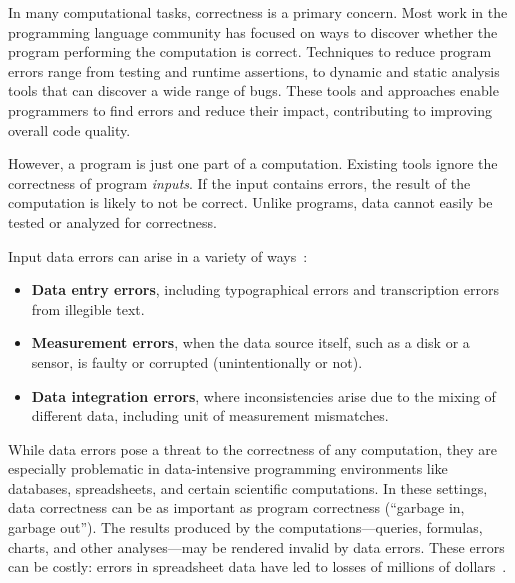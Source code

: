 In many computational tasks, correctness is a primary concern. Most
work in the programming language community has
focused on ways to discover whether the program performing the
computation is correct. Techniques to reduce program errors range from
testing and runtime assertions, to dynamic and static analysis tools
that can discover a wide range of bugs. These tools and approaches enable programmers to find errors and
reduce their impact, contributing to improving overall code quality.


However, a program is just one part of a computation. Existing tools ignore the correctness of program \emph{inputs}. If the input contains errors, the
result of the computation is likely to not be correct. Unlike
programs, data cannot easily be tested or analyzed for correctness.

Input data
errors can arise in a variety of ways~\cite{hellerstein2008quantitative}:

\begin{itemize}

\item {\bf Data entry errors}, including typographical errors and transcription errors from illegible text.

\item {\bf Measurement errors}, when the data source itself, such as a disk or a sensor, is faulty or corrupted (unintentionally or not).

\item {\bf Data integration errors}, where inconsistencies arise due to the mixing of different data, including unit of measurement mismatches.

\end{itemize}


While data errors pose a threat to the correctness of any computation,
they are especially problematic in data-intensive programming
environments like databases, spreadsheets, and certain scientific
computations. In these
settings, data correctness can be as important as program correctness
(``garbage in, garbage out''). The results produced by the
computations---queries, formulas, charts, and other analyses---may be rendered invalid by data errors. These errors can be costly:
errors in spreadsheet data have led to losses of millions of
dollars~\cite{DBLP:journals/corr/abs-0803-2527,sakalerrors}.

